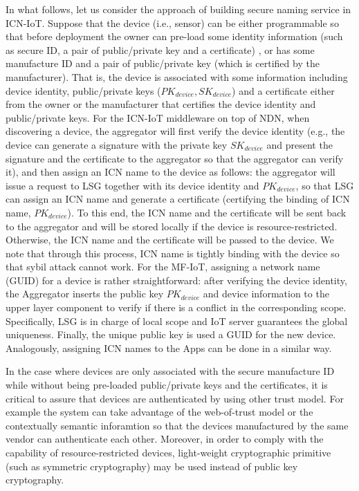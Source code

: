In what follows, let us consider the approach of building secure naming service in ICN-IoT. Suppose that the device (i.e., sensor) can be either programmable so that before deployment the owner can pre-load some identity information (such as secure ID, a pair of public/private key and a certificate) , or has some manufacture ID and a pair of public/private key (which is certified by the manufacturer). That is, the device is associated with some information including device identity, public/private keys ($PK_{device}, SK_{device}$) and a certificate either from the owner or the manufacturer that certifies the device identity and public/private keys. For the ICN-IoT middleware on top of NDN, when discovering a device, the aggregator will first verify the device identity (e.g., the device can generate a signature with the private key $SK_{device}$ and present the signature and the certificate to the aggregator so that the aggregator can verify it), and then assign an ICN name to the device as follows: the aggregator will issue a request to LSG together with its device identity and $PK_{device}$, so that LSG can assign an ICN name and generate a certificate (certifying the binding of ICN name, $PK_{device}$). To this end, the ICN name and the certificate will be sent back to the aggregator and will be stored locally if the device is resource-restricted. Otherwise, the ICN name and the certificate will be passed to the device. We note that through this process, ICN name is tightly binding with the device so that sybil attack cannot work. For the MF-IoT, assigning a network name (GUID) for a device is rather straightforward: after verifying the device identity, the Aggregator
inserts the public key $PK_{device}$ and device information to the upper layer component to verify if there is a conflict in the corresponding scope. Specifically, LSG is in charge of local scope and IoT server guarantees the global uniqueness. Finally, the unique public key is used a GUID for the new device. Analogously, assigning ICN names to the Apps can be done in a similar way.

In the case where devices are only associated with the secure manufacture ID while without being pre-loaded public/private keys and the certificates, it is critical to assure that devices are authenticated by using other trust model. For example the system can take advantage of  the web-of-trust model or the contextually  semantic inforamtion so that the devices manufactured by the same vendor can authenticate each other. Moreover, in order to comply with the capability of resource-restricted devices, light-weight cryptographic primitive (such as symmetric cryptography) may be used instead of public key cryptography.

